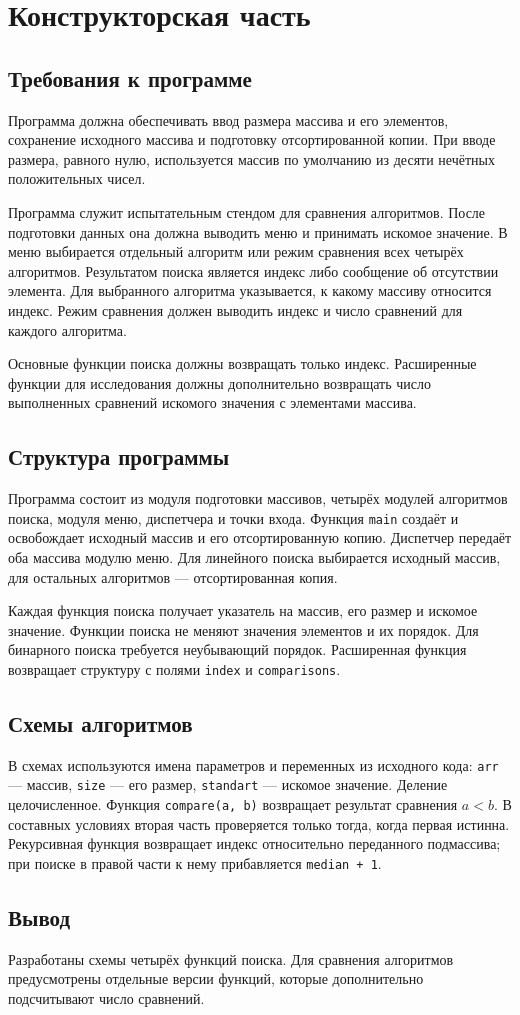 \chapter{Конструкторская часть}
\section{Требования к программе}
Программа должна обеспечивать ввод размера массива и его элементов, сохранение исходного массива и подготовку отсортированной копии. При вводе размера, равного нулю, используется массив по умолчанию из десяти нечётных положительных чисел.

Программа служит испытательным стендом для сравнения алгоритмов. После подготовки данных она должна выводить меню и принимать искомое значение. В меню выбирается отдельный алгоритм или режим сравнения всех четырёх алгоритмов. Результатом поиска является индекс либо сообщение об отсутствии элемента. Для выбранного алгоритма указывается, к какому массиву относится индекс. Режим сравнения должен выводить индекс и число сравнений для каждого алгоритма.

Основные функции поиска должны возвращать только индекс. Расширенные функции для исследования должны дополнительно возвращать число выполненных сравнений искомого значения с элементами массива.

\section{Структура программы}
Программа состоит из модуля подготовки массивов, четырёх модулей алгоритмов поиска, модуля меню, диспетчера и точки входа. Функция \texttt{main} создаёт и освобождает исходный массив и его отсортированную копию. Диспетчер передаёт оба массива модулю меню. Для линейного поиска выбирается исходный массив, для остальных алгоритмов --- отсортированная копия.

Каждая функция поиска получает указатель на массив, его размер и искомое значение. Функции поиска не меняют значения элементов и их порядок. Для бинарного поиска требуется неубывающий порядок. Расширенная функция возвращает структуру с полями \texttt{index} и \texttt{comparisons}.

\section{Схемы алгоритмов}
В схемах используются имена параметров и переменных из исходного кода: \texttt{arr} --- массив, \texttt{size} --- его размер, \texttt{standart} --- искомое значение. Деление целочисленное. Функция \texttt{compare(a, b)} возвращает результат сравнения $a<b$. В составных условиях вторая часть проверяется только тогда, когда первая истинна. Рекурсивная функция возвращает индекс относительно переданного подмассива; при поиске в правой части к нему прибавляется \texttt{median + 1}.





\clearpage
\section*{Вывод}
Разработаны схемы четырёх функций поиска. Для сравнения алгоритмов предусмотрены отдельные версии функций, которые дополнительно подсчитывают число сравнений.
